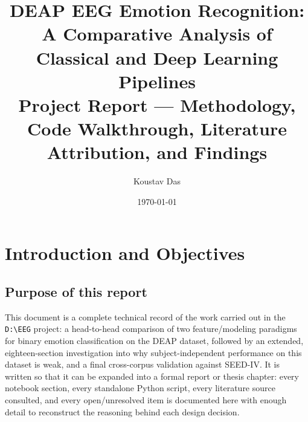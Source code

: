 \documentclass[11pt]{report}
\title{DEAP EEG Emotion Recognition: A Comparative Analysis of\\
Classical and Deep Learning Pipelines\\
\large Project Report --- Methodology, Code Walkthrough, Literature\\
Attribution, and Findings}
\author{Koustav Das}
\date{\today}
\begin{document}
\maketitle
\tableofcontents
\listoffigures
\listoftables

\chapter{Introduction and Objectives}

\section{Purpose of this report}
This document is a complete technical record of the work carried out in the
\texttt{D:\textbackslash EEG} project: a head-to-head comparison of two
feature/modeling paradigms for binary emotion classification on the DEAP
dataset, followed by an extended, eighteen-section investigation into why
subject-independent performance on this dataset is weak, and a final
cross-corpus validation against SEED-IV. It is written so that it can be
expanded into a formal report or thesis chapter: every notebook section,
every standalone Python script, every literature source consulted, and every
open/unresolved item is documented here with enough detail to reconstruct the
reasoning behind each design decision.
\end{document}
